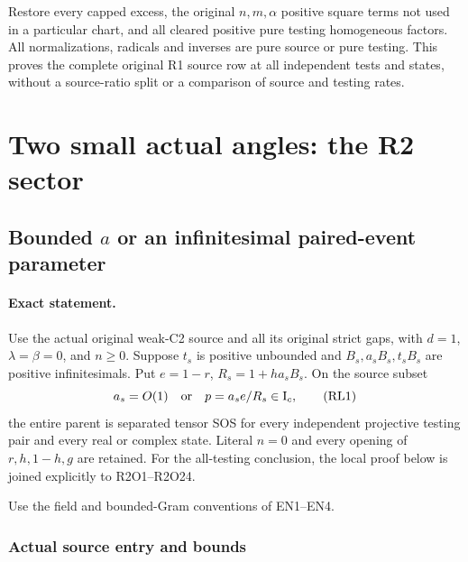 Restore every capped excess, the original $n,m,\alpha$ positive square terms
not used in a particular chart, and all cleared positive pure
testing homogeneous factors.  All normalizations, radicals and
inverses are pure source or pure testing.  This proves the
complete original R1 source row at all independent tests and
states, without a source-ratio split or a comparison of source
and testing rates.

\section{Two small actual angles: the R2 sector}
\subsection{Bounded $a$ or an infinitesimal paired-event parameter}
\label{component:p393d3faa269a}

\label{p393d3faa269a:sec:r2-shifted-local}

\paragraph{Exact statement.}
Use the actual original weak-C2 source and all its original strict
gaps, with \(d=1\), \(\lambda=\beta=0\), and \(n\geq0\).
Suppose \(t_s\) is positive unbounded and
\(B_s,a_sB_s,t_sB_s\) are positive infinitesimals.
Put \(e=1-r\), \(R_s=1+ha_sB_s\).  On the source subset
\[
       a_s=O(1)\quad\hbox{or}\quad
       p=a_s e/R_s\in\mathrm I_c,                     \tag{RL1}
\]
the entire parent is separated tensor SOS for every independent
projective testing pair and every real or complex state.
Literal \(n=0\) and every opening of \(r,h,1-h,g\) are retained.
For the all-testing conclusion, the local proof below is joined
explicitly to R2O1--R2O24.

Use the field and bounded-Gram conventions of EN1--EN4.

\subsubsection*{Actual source entry and bounds}

